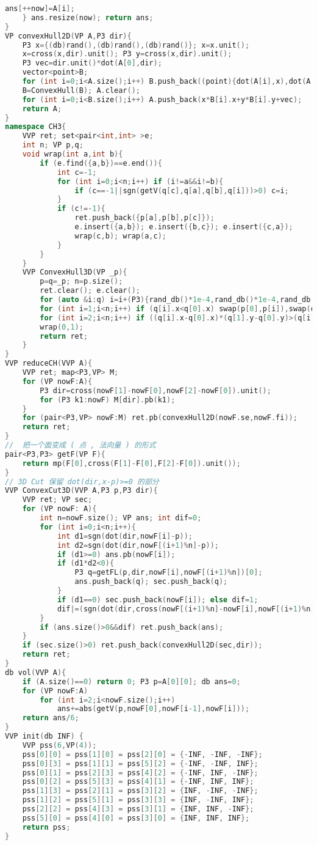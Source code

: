 \begin{lstlisting}[language=C++]
        ans[++now]=A[i];
    } ans.resize(now); return ans;
}
VP convexHull2D(VP A,P3 dir){
    P3 x={(db)rand(),(db)rand(),(db)rand()}; x=x.unit();
    x=cross(x,dir).unit(); P3 y=cross(x,dir).unit();
    P3 vec=dir.unit()*dot(A[0],dir);
    vector<point>B;
    for (int i=0;i<A.size();i++) B.push_back((point){dot(A[i],x),dot(A[i],y)});
    B=ConvexHull(B); A.clear();
    for (int i=0;i<B.size();i++) A.push_back(x*B[i].x+y*B[i].y+vec);
    return A;
}
namespace CH3{
    VVP ret; set<pair<int,int> >e;
    int n; VP p,q;
    void wrap(int a,int b){
        if (e.find({a,b})==e.end()){
            int c=-1;
            for (int i=0;i<n;i++) if (i!=a&&i!=b){
                if (c==-1||sgn(getV(q[c],q[a],q[b],q[i]))>0) c=i;
            }
            if (c!=-1){
                ret.push_back({p[a],p[b],p[c]});
                e.insert({a,b}); e.insert({b,c}); e.insert({c,a});
                wrap(c,b); wrap(a,c);
            }
        }
    }
    VVP ConvexHull3D(VP _p){
        p=q=_p; n=p.size();
        ret.clear(); e.clear();
        for (auto &i:q) i=i+(P3){rand_db()*1e-4,rand_db()*1e-4,rand_db()*1e-4};
        for (int i=1;i<n;i++) if (q[i].x<q[0].x) swap(p[0],p[i]),swap(q[0],q[i]);
        for (int i=2;i<n;i++) if ((q[i].x-q[0].x)*(q[1].y-q[0].y)>(q[i].y-q[0].y)*(q[1].x-q[0].x)) swap(q[1],q[i]),swap(p[1],p[i]);
        wrap(0,1);
        return ret;
    }
}
VVP reduceCH(VVP A){
    VVP ret; map<P3,VP> M;
    for (VP nowF:A){
        P3 dir=cross(nowF[1]-nowF[0],nowF[2]-nowF[0]).unit();
        for (P3 k1:nowF) M[dir].pb(k1);
    }
    for (pair<P3,VP> nowF:M) ret.pb(convexHull2D(nowF.se,nowF.fi));
    return ret;
}
//  把一个面变成 ( 点 , 法向量 ) 的形式
pair<P3,P3> getF(VP F){
    return mp(F[0],cross(F[1]-F[0],F[2]-F[0]).unit());
}
// 3D Cut 保留 dot(dir,x-p)>=0 的部分
VVP ConvexCut3D(VVP A,P3 p,P3 dir){
    VVP ret; VP sec;
    for (VP nowF: A){
        int n=nowF.size(); VP ans; int dif=0;
        for (int i=0;i<n;i++){
            int d1=sgn(dot(dir,nowF[i]-p));
            int d2=sgn(dot(dir,nowF[(i+1)%n]-p));
            if (d1>=0) ans.pb(nowF[i]);
            if (d1*d2<0){
                P3 q=getFL(p,dir,nowF[i],nowF[(i+1)%n])[0];
                ans.push_back(q); sec.push_back(q);
            }
            if (d1==0) sec.push_back(nowF[i]); else dif=1;
            dif|=(sgn(dot(dir,cross(nowF[(i+1)%n]-nowF[i],nowF[(i+1)%n]-nowF[i])))==-1);
        }
        if (ans.size()>0&&dif) ret.push_back(ans);
    }
    if (sec.size()>0) ret.push_back(convexHull2D(sec,dir));
    return ret;
}
db vol(VVP A){
    if (A.size()==0) return 0; P3 p=A[0][0]; db ans=0;
    for (VP nowF:A)
        for (int i=2;i<nowF.size();i++)
            ans+=abs(getV(p,nowF[0],nowF[i-1],nowF[i]));
    return ans/6;
}
VVP init(db INF) {
    VVP pss(6,VP(4));
    pss[0][0] = pss[1][0] = pss[2][0] = {-INF, -INF, -INF};
    pss[0][3] = pss[1][1] = pss[5][2] = {-INF, -INF, INF};
    pss[0][1] = pss[2][3] = pss[4][2] = {-INF, INF, -INF};
    pss[0][2] = pss[5][3] = pss[4][1] = {-INF, INF, INF};
    pss[1][3] = pss[2][1] = pss[3][2] = {INF, -INF, -INF};
    pss[1][2] = pss[5][1] = pss[3][3] = {INF, -INF, INF};
    pss[2][2] = pss[4][3] = pss[3][1] = {INF, INF, -INF};
    pss[5][0] = pss[4][0] = pss[3][0] = {INF, INF, INF};
    return pss;
}
\end{lstlisting}
